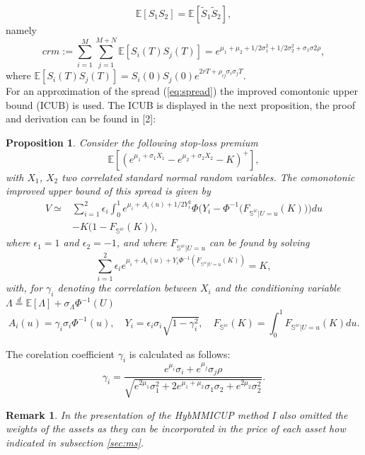\documentclass[a4paper]{article}
\newtheorem{prop}{Proposition}
\newtheorem*{remark}{Remark}
\begin{document}
$$\mathbb{E}[S_1S_2] = \mathbb{E}[\tilde{S}_1\tilde{S}_2],$$
namely
\begin{equation}
crm:=\sum_{i=1}^{M}\sum_{j=1}^{M+N}\mathbb{E}[S_i(T)S_j(T)]=e^{\mu_1+\mu_2+1/2\sigma_1^2+1/2\sigma_2^2+\sigma_1\sigma2\rho},
\end{equation}
where $\mathbb{E}[S_i(T)S_j(T)] = S_i(0) S_j(0) e^{2rT+\rho_{ij}\sigma_i\sigma_jT}.$\\
For an approximation of the spread (\ref{eq:spread}) the improved comontonic upper bound (ICUB) is used. The ICUB is displayed in the next proposition, the proof and derivation can be found in [2]:
\begin{prop}
Consider the following stop-loss premium
$$\mathbb{E}[(e^{\mu_1+\sigma_1X_1}-e^{\mu_2+\sigma_2X_2}-K)^+],$$
with $X_1$, $X_2$ two correlated standard normal random variables. The comonotonic improved upper bound of this spread is given by
\begin{equation}
\label{eq:ints}
\begin{split}
V \simeq &\sum_{i=1}^2\epsilon_i\int_0^1e^{\mu_i+A_i(u)+1/2Y_i^2}\Phi\big(Y_i-\Phi^{-1}\big(F_{\mathbb{S}^{ic}|U=u}(K)\big)\big)du\\
	&-K\big(1-F_{\mathbb{S}^{ic}}(K)\big),
\end{split}
\end{equation}
where $\epsilon_1=1$ and $\epsilon_2=-1$, and where $F_{\mathbb{S}^{ic}|U=u}$ can be found by solving
\begin{equation}
\label{eq:fzero}
\sum_{i=1}^2\epsilon_ie^{\mu_i+A_i(u)+Y_i\Phi^{-1}(F_{\mathbb{S}^{ic}|U=u}(K))}=K,
\end{equation}
with, for $\gamma_i$ denoting the correlation between $X_i$ and the conditioning variable $\Lambda \stackrel{d}{=} \mathbb{E}[\Lambda]+\sigma_{\Lambda}\Phi^{-1}(U)$
\begin{equation*}
A_i(u)=\gamma_i\sigma_i\Phi^{-1}(u),\quad Y_i=\epsilon_i\sigma_i\sqrt{1-\gamma_i^2}, \quad F_{\mathbb{S}^{ic}}(K) = \int_0^1F_{\mathbb{S}^{ic}|U=u}(K)du.
\end{equation*}
\end{prop}
The corelation coefficient $\gamma_i$ is calculated as follows:
$$\gamma_i = \frac{e^{\mu_i}\sigma_i+e^{\mu_j}\sigma_j\rho}{\sqrt{e^{2\mu_1}\sigma_1^2+2e^{\mu_1+\mu_2}\sigma_1\sigma_2+e^{2\mu_2}\sigma_2^2}}.$$
\begin{remark}
In the presentation of the HybMMICUP method I also omitted the weights of the assets as they can be incorporated in the price of each asset how indicated in subsection \ref{sec:ms}.
\end{remark}
\end{document}
